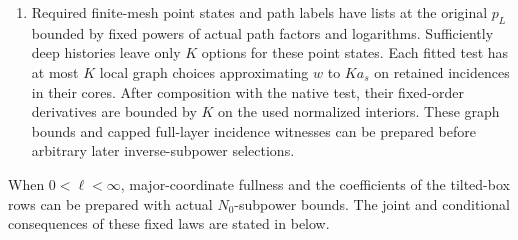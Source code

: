\begin{proposition}
\begin{enumerate}
coordinates and put \(v=Z'\).  The fixed conditional parent palette
\(\pi_A\), the velocity marginal of \(\lambda_A^0\), satisfies
\(\pi_A(B_p)\le Kp^S\).  If \(E\) denotes the end history,
then before likelihood deletion the required velocity bin satisfies
\[
 \sum_Ap_A I_{\lambda_A^0}([v];E)=o(\log N).
\]
Thus the information bound is averaged with the fixed parent weights.
\item Required finite-mesh point states and path labels have lists
at the original \(p_L\) bounded by fixed powers of actual path factors
and logarithms.  Sufficiently deep histories leave only \(K\) options
for these point states.  Each fitted test has at most \(K\) local graph choices approximating
\(w\) to \(Ka_s\) on retained incidences in their cores.  After composition with the native test, their
fixed-order derivatives are bounded by \(K\) on the used normalized
interiors.  These graph bounds and capped full-layer incidence witnesses
can be prepared before arbitrary later inverse-subpower selections.
\end{enumerate}
When \(0<\ell<\infty\), major-coordinate fullness and the coefficients
of the tilted-box rows can be prepared with actual \(N_0\)-subpower
bounds.  The joint and conditional consequences of these fixed laws are
stated in  below.
\end{proposition}

